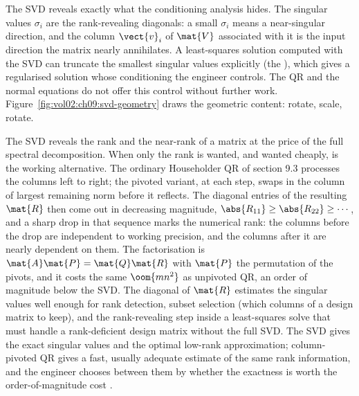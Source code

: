 The SVD reveals exactly what the conditioning analysis hides. The
singular values $\sigma_{i}$ are the rank-revealing diagonals: a
small $\sigma_{i}$ means a near-singular direction, and the column
$\vect{v}_{i}$ of $\mat{V}$ associated with it is the input direction
the matrix nearly annihilates. A least-squares solution computed
with the SVD can truncate the smallest singular values explicitly
(the ), which gives a regularised solution
whose conditioning the engineer controls. The QR and the normal
equations do not offer this control without further work.
Figure~\ref{fig:vol02:ch09:svd-geometry} draws the geometric
content: rotate, scale, rotate.



\begin{mastery}
The SVD reveals the rank and the near-rank of a matrix at the price of
the full spectral decomposition. When only the rank is wanted, and
wanted cheaply,  is the working
alternative. The ordinary Householder QR of section 9.3 processes the
columns left to right; the pivoted variant, at each step, swaps in the
column of largest remaining norm before it reflects. The diagonal
entries of the resulting $\mat{R}$ then come out in decreasing
magnitude, $\abs{R_{11}} \geq \abs{R_{22}} \geq \cdots$, and a sharp
drop in that sequence marks the numerical rank: the columns before the
drop are independent to working precision, and the columns after it are
nearly dependent on them. The factorisation is $\mat{A}\mat{P} =
\mat{Q}\mat{R}$ with $\mat{P}$ the permutation of the pivots, and it
costs the same $\oom{mn^{2}}$ as unpivoted QR, an order of magnitude
below the SVD. The diagonal of $\mat{R}$ estimates the singular values
well enough for rank detection, subset selection (which columns of a
design matrix to keep), and the rank-revealing step inside a
least-squares solve that must handle a rank-deficient design matrix
without the full SVD. The SVD gives the exact singular values and the
optimal low-rank approximation; column-pivoted QR gives a fast, usually
adequate estimate of the same rank information, and the engineer chooses
between them by whether the exactness is worth the order-of-magnitude
cost \cite[ch.~5]{text:v2ch09-golub-vanloan2013}.
\end{mastery}

